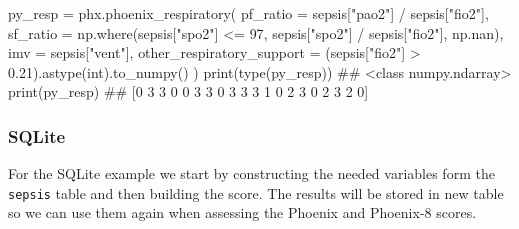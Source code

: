 \documentclass[
  letterpaper,
  DIV=11,
  numbers=noendperiod]{scrartcl}
\newenvironment{Shaded}{\begin{snugshade}}{\end{snugshade}}
\newcommand{\BuiltInTok}[1]{\textcolor[rgb]{0.00,0.23,0.31}{#1}}
\newcommand{\CommentTok}[1]{\textcolor[rgb]{0.37,0.37,0.37}{#1}}
\newcommand{\DecValTok}[1]{\textcolor[rgb]{0.68,0.00,0.00}{#1}}
\newcommand{\FloatTok}[1]{\textcolor[rgb]{0.68,0.00,0.00}{#1}}
\newcommand{\NormalTok}[1]{\textcolor[rgb]{0.00,0.23,0.31}{#1}}
\newcommand{\OperatorTok}[1]{\textcolor[rgb]{0.37,0.37,0.37}{#1}}
\newcommand{\StringTok}[1]{\textcolor[rgb]{0.13,0.47,0.30}{#1}}
\begin{document}
\begin{Shaded}
\begin{Highlighting}[]
\NormalTok{py\_resp }\OperatorTok{=}\NormalTok{ phx.phoenix\_respiratory(}
\NormalTok{    pf\_ratio }\OperatorTok{=}\NormalTok{ sepsis[}\StringTok{"pao2"}\NormalTok{] }\OperatorTok{/}\NormalTok{ sepsis[}\StringTok{"fio2"}\NormalTok{],}
\NormalTok{    sf\_ratio }\OperatorTok{=}\NormalTok{ np.where(sepsis[}\StringTok{"spo2"}\NormalTok{] }\OperatorTok{\textless{}=} \DecValTok{97}\NormalTok{, sepsis[}\StringTok{"spo2"}\NormalTok{] }\OperatorTok{/}\NormalTok{ sepsis[}\StringTok{"fio2"}\NormalTok{], np.nan),}
\NormalTok{    imv      }\OperatorTok{=}\NormalTok{ sepsis[}\StringTok{"vent"}\NormalTok{],}
\NormalTok{    other\_respiratory\_support }\OperatorTok{=}\NormalTok{ (sepsis[}\StringTok{"fio2"}\NormalTok{] }\OperatorTok{\textgreater{}} \FloatTok{0.21}\NormalTok{).astype(}\BuiltInTok{int}\NormalTok{).to\_numpy()}
\NormalTok{)}
\BuiltInTok{print}\NormalTok{(}\BuiltInTok{type}\NormalTok{(py\_resp))}
\CommentTok{\#\# \textless{}class \textquotesingle{}numpy.ndarray\textquotesingle{}\textgreater{}}
\BuiltInTok{print}\NormalTok{(py\_resp)}
\CommentTok{\#\# [0 3 3 0 0 3 3 0 3 3 3 1 0 2 3 0 2 3 2 0]}
\end{Highlighting}
\end{Shaded}

\subsubsection{SQLite}\label{sqlite}

For the SQLite example we start by constructing the needed variables
form the \texttt{sepsis} table and then building the score. The results
will be stored in new table so we can use them again when assessing the
Phoenix and Phoenix-8 scores.
\end{document}
